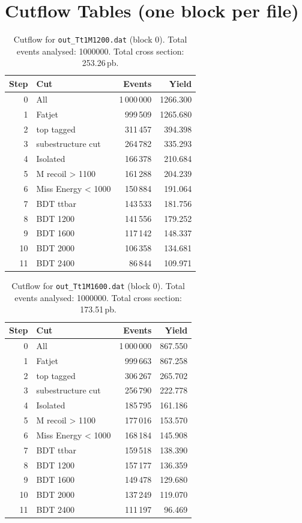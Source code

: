 \documentclass{article}
\begin{document}
\section*{Cutflow Tables (one block per file)}
\begin{table}[H]
\centering
\begin{tabular}{r l r r}
\toprule
Step & Cut & Events & Yield \\
\midrule
0 & All & 1\,000\,000 & 1266.300 \\
1 & Fatjet & 999\,509 & 1265.680 \\
2 & top tagged & 311\,457 & 394.398 \\
3 & subestructure cut & 264\,782 & 335.293 \\
4 & Isolated & 166\,378 & 210.684 \\
5 & M recoil > 1100 & 161\,288 & 204.239 \\
6 & Miss Energy < 1000 & 150\,884 & 191.064 \\
7 & BDT ttbar & 143\,533 & 181.756 \\
8 & BDT 1200 & 141\,556 & 179.252 \\
9 & BDT 1600 & 117\,142 & 148.337 \\
10 & BDT 2000 & 106\,358 & 134.681 \\
11 & BDT 2400 & 86\,844 & 109.971 \\
\bottomrule
\end{tabular}
\caption{Cutflow for \texttt{out\_Tt1M1200.dat} (block 0). Total events analysed: 1000000. Total cross section: 253.26\,pb.}
\label{tab:cutflow-out-Tt1M1200-dat}
\end{table}

\begin{table}[H]
\centering
\begin{tabular}{r l r r}
\toprule
Step & Cut & Events & Yield \\
\midrule
0 & All & 1\,000\,000 & 867.550 \\
1 & Fatjet & 999\,663 & 867.258 \\
2 & top tagged & 306\,267 & 265.702 \\
3 & subestructure cut & 256\,790 & 222.778 \\
4 & Isolated & 185\,795 & 161.186 \\
5 & M recoil > 1100 & 177\,016 & 153.570 \\
6 & Miss Energy < 1000 & 168\,184 & 145.908 \\
7 & BDT ttbar & 159\,518 & 138.390 \\
8 & BDT 1200 & 157\,177 & 136.359 \\
9 & BDT 1600 & 149\,478 & 129.680 \\
10 & BDT 2000 & 137\,249 & 119.070 \\
11 & BDT 2400 & 111\,197 & 96.469 \\
\bottomrule
\end{tabular}
\caption{Cutflow for \texttt{out\_Tt1M1600.dat} (block 0). Total events analysed: 1000000. Total cross section: 173.51\,pb.}
\label{tab:cutflow-out-Tt1M1600-dat}
\end{table}
\end{document}
